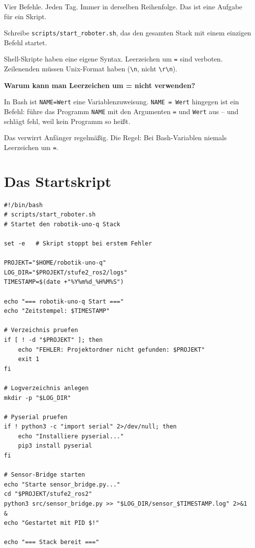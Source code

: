 Vier Befehle. Jeden Tag. Immer in derselben Reihenfolge.
Das ist eine Aufgabe für ein Skript.

\begin{aufgabeBox}
Schreibe \texttt{scripts/start\_roboter.sh}, das den gesamten
Stack mit einem einzigen Befehl startet.
\end{aufgabeBox}

\begin{problemBox}
Shell-Skripte haben eine eigene Syntax. Leerzeichen um
\texttt{=} sind verboten. Zeilenenden müssen Unix-Format
haben (\texttt{\textbackslash n}, nicht \texttt{\textbackslash r\textbackslash n}).
\end{problemBox}

\begin{haubeBox}
\textbf{Warum kann man Leerzeichen um = nicht verwenden?}

In Bash ist \texttt{NAME=Wert} eine Variablenzuweisung.
\texttt{NAME = Wert} hingegen ist ein Befehl: führe das
Programm \texttt{NAME} mit den Argumenten \texttt{=}
und \texttt{Wert} aus -- und schlägt fehl, weil kein
Programm so heißt.

Das verwirrt Anfänger regelmäßig.
Die Regel: Bei Bash-Variablen niemals Leerzeichen um \texttt{=}.
\end{haubeBox}

\section{Das Startskript}

\begin{lstlisting}[style=bash]
#!/bin/bash
# scripts/start_roboter.sh
# Startet den robotik-uno-q Stack

set -e   # Skript stoppt bei erstem Fehler

PROJEKT="$HOME/robotik-uno-q"
LOG_DIR="$PROJEKT/stufe2_ros2/logs"
TIMESTAMP=$(date +"%Y%m%d_%H%M%S")

echo "=== robotik-uno-q Start ==="
echo "Zeitstempel: $TIMESTAMP"

# Verzeichnis pruefen
if [ ! -d "$PROJEKT" ]; then
    echo "FEHLER: Projektordner nicht gefunden: $PROJEKT"
    exit 1
fi

# Logverzeichnis anlegen
mkdir -p "$LOG_DIR"

# Pyserial pruefen
if ! python3 -c "import serial" 2>/dev/null; then
    echo "Installiere pyserial..."
    pip3 install pyserial
fi

# Sensor-Bridge starten
echo "Starte sensor_bridge.py..."
cd "$PROJEKT/stufe2_ros2"
python3 src/sensor_bridge.py >> "$LOG_DIR/sensor_$TIMESTAMP.log" 2>&1 &
echo "Gestartet mit PID $!"

echo "=== Stack bereit ==="
\end{lstlisting}

